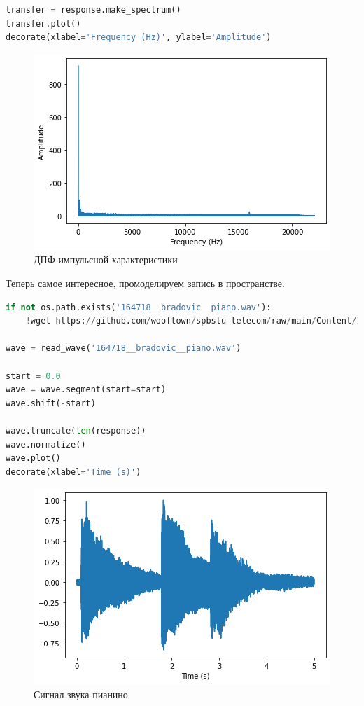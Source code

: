 \begin{lstlisting}[language=Python]
transfer = response.make_spectrum()
transfer.plot()
decorate(xlabel='Frequency (Hz)', ylabel='Amplitude')
\end{lstlisting}
\begin{figure}[H]
	\begin{center}
		\includegraphics[scale=1]{fig/lab10/lab10_21_0.png}
		\caption{ДПФ импульсной характеристики}
	\end{center}
\end{figure}

Теперь самое интересное, промоделируем запись в пространстве.

\begin{lstlisting}[language=Python]
if not os.path.exists('164718__bradovic__piano.wav'):
    !wget https://github.com/wooftown/spbstu-telecom/raw/main/Content/164718__bradovic__piano.wav
    
wave = read_wave('164718__bradovic__piano.wav')

start = 0.0
wave = wave.segment(start=start)
wave.shift(-start)

wave.truncate(len(response))
wave.normalize()
wave.plot()
decorate(xlabel='Time (s)')
\end{lstlisting}
\begin{figure}[H]
	\begin{center}
		\includegraphics[scale=1]{fig/lab10/lab10_24_0.png}
		\caption{Сигнал звука пианино}
	\end{center}
\end{figure}

